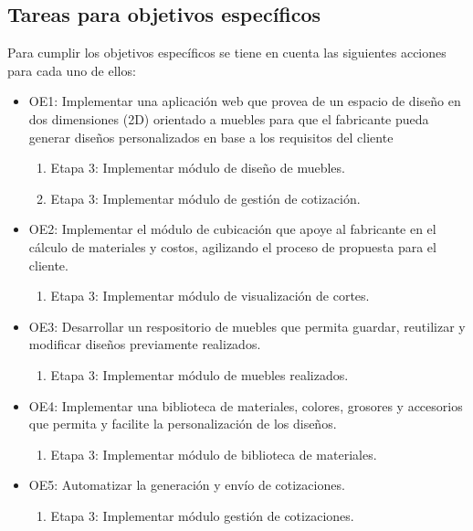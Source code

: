 ﻿\documentclass{iccmemoria}
\begin{document}
\subsection{Tareas para objetivos específicos}
Para cumplir los objetivos específicos se tiene en cuenta las siguientes
 acciones para cada uno de ellos:

\begin{itemize}
\item OE1: Implementar una aplicación web que provea de un espacio de diseño en dos dimensiones (2D) orientado a muebles para que el fabricante pueda generar diseños
personalizados en base a los requisitos del cliente
\begin{enumerate}
\item Etapa 3: Implementar módulo de diseño de muebles.
\item  Etapa 3: Implementar módulo de gestión de cotización.
\end{enumerate}

\item OE2: Implementar el módulo de cubicación que apoye al fabricante en el cálculo de materiales y costos, agilizando el proceso de propuesta para el cliente.
\begin{enumerate}
\item Etapa 3: Implementar módulo de visualización de cortes.
\end{enumerate}

\item OE3: Desarrollar un respositorio de muebles que permita guardar, reutilizar y modificar
diseños previamente realizados.
\begin{enumerate}
\item Etapa 3: Implementar módulo de muebles realizados.
\end{enumerate}

\item OE4: Implementar una biblioteca de materiales, colores, grosores y accesorios que permita y facilite la personalización de los diseños.
\begin{enumerate}
\item Etapa 3: Implementar módulo de biblioteca de materiales.
\end{enumerate}

\item OE5: Automatizar la generación y envío de cotizaciones.
\begin{enumerate}
\item Etapa 3: Implementar módulo gestión de cotizaciones.
\end{enumerate}


\end{itemize}
\end{document}
